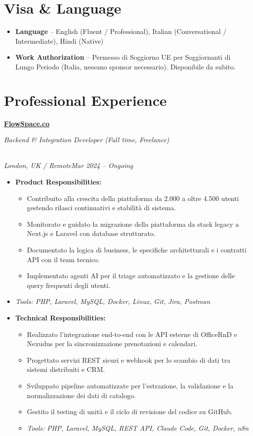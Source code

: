 \documentclass[a4paper,10pt]{article}
\newcommand{\role}[4]{\vspace{3pt}\noindent\hspace{0.6em}\parbox[t]{0.38\textwidth}{\raggedright\textbf{#1}}\hfill\parbox[t]{0.58\textwidth}{\raggedleft\textit{#2}}\\{\textit{#3}\hfill\textit{#4}}\vspace{1pt}}
\begin{document}
\section{Visa \& Language}
\begin{itemize}
\item \textbf{Language} -- English (Fluent / Professional), Italian (Conversational / Intermediate), Hindi (Native)
\item \textbf{Work Authorization} -- Permesso di Soggiorno UE per Soggiornanti di Lungo Periodo (Italia, nessuno sponsor necessario). Disponibile da subito.
\end{itemize}

\section{Professional Experience}
\role{\href{https://flowspace.co}{FlowSpace.co}}{Backend \& Integration Developer (Full time, Freelance)}{London, UK / Remote}{Mar 2024 -- Ongoing}
\begin{itemize}
\item \textbf{Product Responsibilities:}
\begin{itemize}[label=--]
\item Contribuito alla crescita della piattaforma da 2.000 a oltre 4.500 utenti gestendo rilasci continuativi e stabilità di sistema.
\item Monitorato e guidato la migrazione della piattaforma da stack legacy a Next.js e Laravel con database strutturato.
\item Documentato la logica di business, le specifiche architetturali e i contratti API con il team tecnico.
\item Implementato agenti AI per il triage automatizzato e la gestione delle query frequenti degli utenti.
\end{itemize}
\item \textit{Tools: PHP, Laravel, MySQL, Docker, Linux, Git, Jira, Postman}
\item \textbf{Technical Responsibilities:}
\begin{itemize}[label=--]
\item Realizzato l'integrazione end-to-end con le API esterne di OfficeRnD e Nexudus per la sincronizzazione prenotazioni e calendari.
\item Progettato servizi REST sicuri e webhook per lo scambio di dati tra sistemi distribuiti e CRM.
\item Sviluppato pipeline automatizzate per l'estrazione, la validazione e la normalizzazione dei dati di catalogo.
\item Gestito il testing di unità e il ciclo di revisione del codice su GitHub.
\item \textit{Tools: PHP, Laravel, MySQL, REST API, Claude Code, Git, Docker, n8n}
\end{itemize}
\end{itemize}
\end{document}
